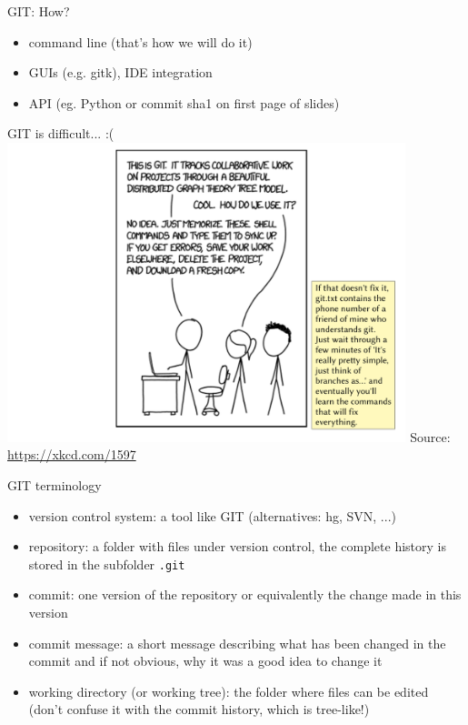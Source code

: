 \begin{frame}[fragile]{GIT: How?}
    \begin{itemize}
        \item command line (that's how we will do it)
        \item GUIs (e.g. gitk), IDE integration
        \item API (eg. Python or commit sha1 on first page of slides)
    \end{itemize}
\end{frame}

\begin{frame}[fragile]{GIT is difficult... :(}
    \includegraphics[width=0.87\textwidth]{images/xkcd-git-is-hard.pdf}
    {\tiny Source:
        \href{https://xkcd.com/1597kjA}{https://xkcd.com/1597}
    }
\end{frame}


\begin{frame}[fragile]{GIT terminology}
    \begin{itemize}
        \item version control system: a tool like GIT (alternatives: hg, SVN, ...)
        \item repository: a folder with files under version control, the complete history is
            stored in the subfolder \verb|.git|
        \item commit: one version of the repository or equivalently the change made in this
            version
        \item commit message: a short message describing what has been changed in the commit
            and if not obvious, why it was a good idea to change it
        \item working directory (or working tree): the folder where files can be edited (don't
            confuse it with the commit history, which is tree-like!)
    \end{itemize}
\end{frame}


